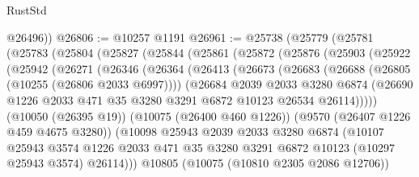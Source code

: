 \begin{lexlean}{RustStd}
\begin{coremodule}
        @26496))
@26806 := @10257 @1191
@26961 := @25738
    (@25779
      (@25781
        (@25783
          (@25804
            (@25827
              (@25844
                (@25861
                  (@25872
                    (@25876
                      (@25903
                        (@25922
                          (@25942
                            (@26271
                              (@26346
                                (@26364
                                  (@26413
                                    (@26673
                                      (@26683
                                        (@26688 (@26805 (@10255 (@26806 @2033 @6997))))
                                        (@26684
                                          @2039
                                          @2033
                                          @3280
                                          @6874
                                          (@26690
                                            @1226
                                            @2033
                                            @471
                                            @35
                                            @3280
                                            @3291
                                            @6872
                                            @10123
                                            @26534
                                            @26114)))))
                                  (@10050 (@26395 @19))
                                  (@10075 (@26400 @460 @1226))
                                  (@9570 (@26407 @1226 @459 @4675 @3280))
                                  (@10098
                                    @25943
                                    @2039
                                    @2033
                                    @3280
                                    @6874
                                    (@10107
                                      @25943
                                      @3574
                                      @1226
                                      @2033
                                      @471
                                      @35
                                      @3280
                                      @3291
                                      @6872
                                      @10123
                                      (@10297 @25943 @3574)
                                      @26114)))
                                @10805
                                (@10075 (@10810 @2305 @2086 @12706))

\end{coremodule}
\end{lexlean}

